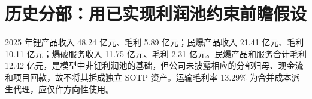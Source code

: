\section{历史分部：用已实现利润池约束前瞻假设}

2025 年锂产品收入 48.24 亿元、毛利 5.89 亿元；民爆产品收入 21.41 亿元、毛利 10.11 亿元；爆破服务收入 11.75 亿元、毛利 2.31 亿元。民爆产品和服务合计毛利 12.42 亿元，是模型中非锂利润池的基础，但公司未披露相应的分部归母、现金流和项目回款，故不将其拆成独立 SOTP 资产。运输毛利率 13.29\% 为合并成本派生代理，应仅作方向性使用。

